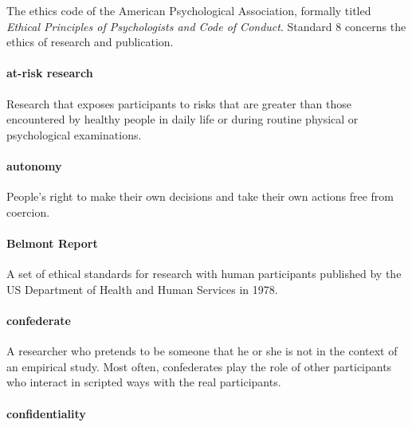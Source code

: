 \documentclass[
]{krantz}
\begin{document}
The ethics code of the American Psychological Association, formally titled \emph{Ethical Principles of Psychologists and Code of Conduct}. Standard 8 concerns the ethics of research and publication.

\hypertarget{at-risk-research}{%
\paragraph*{at-risk research}\label{at-risk-research}}

Research that exposes participants to risks that are greater than those encountered by healthy people in daily life or during routine physical or psychological examinations.

\hypertarget{autonomy}{%
\paragraph*{autonomy}\label{autonomy}}

People's right to make their own decisions and take their own actions free from coercion.

\hypertarget{belmont-report}{%
\paragraph*{Belmont Report}\label{belmont-report}}

A set of ethical standards for research with human participants published by the US Department of Health and Human Services in 1978.

\hypertarget{confederate}{%
\paragraph*{confederate}\label{confederate}}

A researcher who pretends to be someone that he or she is not in the context of an empirical study. Most often, confederates play the role of other participants who interact in scripted ways with the real participants.

\hypertarget{confidentiality}{%
\paragraph*{confidentiality}\label{confidentiality}}
\end{document}
